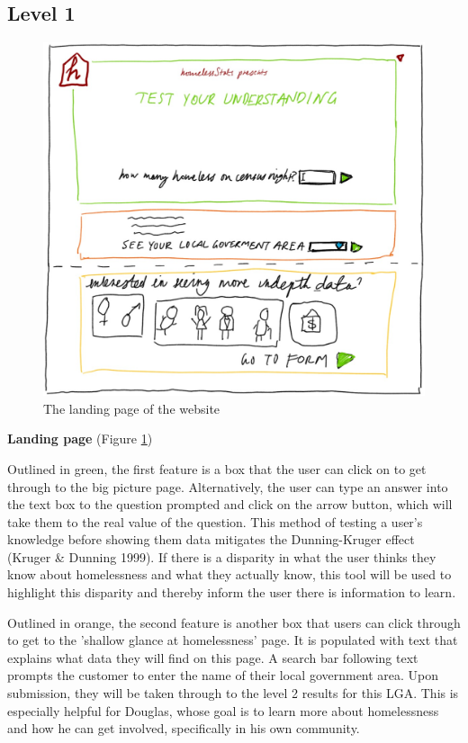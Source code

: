 \documentclass[12pt, a4paper]{article}
\begin{document}
\subsection{Level 1}
\begin{figure}[h]
\centering
\includegraphics[scale=.8]{LandingPage.jpg} 
\caption{The landing page of the website}
\label{fig:landing}
\end{figure}
\textbf{Landing page} (Figure \ref{fig:landing}) 

Outlined in green, the first feature is a box that the user can click on to get through to the big picture page. Alternatively, the user can type an answer into the text box to the question prompted and click on the arrow button, which will take them to the real value of the question. This method of testing a user's knowledge before showing them data mitigates the Dunning-Kruger effect (Kruger \& Dunning 1999). If there is a disparity in what the user thinks they know about homelessness and what they actually know, this tool will be used to highlight this disparity and thereby inform the user there is information to learn. 

Outlined in orange, the second feature is another box that users can click through to get to the 'shallow glance at homelessness' page. It is populated with text that explains what data they will find on this page. A search bar following text prompts the customer to enter the name of their local government area. Upon submission, they will be taken through to the level 2 results for this LGA. This is especially helpful for Douglas, whose goal is to learn more about homelessness and how he can get involved, specifically in his own community.
\end{document}
